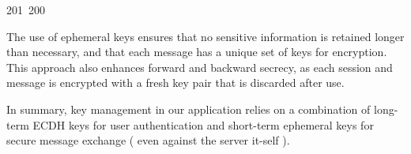 201~200~\documentclass{article}
\begin{document}
	                                                                                                                                                                                                                                                                                                	                                                                                                                                        	    	                                                                                                	                                                                                                                                                                                                                                                The use of ephemeral keys ensures that no sensitive information is retained longer than necessary, and that each message has a unique set of keys for encryption. This approach also enhances forward and backward secrecy, as each session and message is encrypted with a fresh key pair that is discarded after use.

	                                                                                                                                                                                                                                                                                                	                                                                                                                                        	    	                                                                                                	                                                                                                                                                                                                                                                In summary, key management in our application relies on a combination of long-term ECDH keys for user authentication and short-term ephemeral keys for secure message exchange ( even against the server it-self ).


	                                                                                                                                                                                                                                                                                                	                                                                                                                                        	    	                                                                                                	                                                                                                                                                                                                                                                \clearpage
\end{document}
